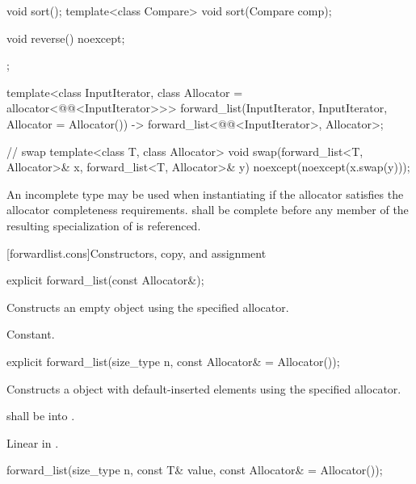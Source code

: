 \begin{codeblock}
{{    void sort();
    template<class Compare> void sort(Compare comp);

    void reverse() noexcept;
  };

  template<class InputIterator, class Allocator = allocator<@@<InputIterator>>>
    forward_list(InputIterator, InputIterator, Allocator = Allocator())
      -> forward_list<@@<InputIterator>, Allocator>;

  // swap
  template<class T, class Allocator>
    void swap(forward_list<T, Allocator>& x, forward_list<T, Allocator>& y)
      noexcept(noexcept(x.swap(y)));
}
\end{codeblock}

\pnum
An incomplete type  may be used when instantiating 
if the allocator satisfies the
allocator completeness requirements.
 shall be complete before any member of the resulting specialization
of  is referenced.

[forwardlist.cons]{Constructors, copy, and assignment}

%
\begin{itemdecl}
explicit forward_list(const Allocator&);
\end{itemdecl}

\begin{itemdescr}
\pnum
\effects Constructs an empty  object using the specified allocator.

\pnum
\complexity Constant.
\end{itemdescr}

%
\begin{itemdecl}
explicit forward_list(size_type n, const Allocator& = Allocator());
\end{itemdecl}

\begin{itemdescr}
\pnum
\effects Constructs a  object with 
default-inserted elements using the specified allocator.

\pnum
\requires {} shall be  into .

\pnum
\complexity Linear in .
\end{itemdescr}

%
\begin{itemdecl}
forward_list(size_type n, const T& value, const Allocator& = Allocator());
\end{itemdecl}

